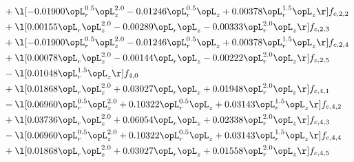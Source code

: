 \begin{alignat}{2}
& + \l[  -0.01900 \opL_r^{0.5} \opL_z^{2.0}   -0.01246 \opL_r^{0.5} \opL_z +  0.00378 \opL_r^{1.5} \opL_z  \r] f_{c,2,2} \nonumber \\ 
& + \l[  0.00155 \opL_r \opL_z^{2.0}   -0.00289 \opL_r \opL_z   -0.00333 \opL_r^{2.0} \opL_z  \r] f_{c,2,3} \nonumber \\ 
& + \l[  -0.01900 \opL_r^{0.5} \opL_z^{2.0}   -0.01246 \opL_r^{0.5} \opL_z +  0.00378 \opL_r^{1.5} \opL_z  \r] f_{c,2,4} \nonumber \\ 
& + \l[  0.00078 \opL_r \opL_z^{2.0}   -0.00144 \opL_r \opL_z   -0.00222 \opL_r^{2.0} \opL_z  \r] f_{c,2,5} \nonumber \\ 
& - \l[  0.01048 \opL_r^{1.5} \opL_z  \r] f_{4,0} \nonumber \\ 
& + \l[  0.01868 \opL_r \opL_z^{2.0} +  0.03027 \opL_r \opL_z +  0.01948 \opL_r^{2.0} \opL_z  \r] f_{c,4,1} \nonumber \\ 
& - \l[  0.06960 \opL_r^{0.5} \opL_z^{2.0} +  0.10322 \opL_r^{0.5} \opL_z +  0.03143 \opL_r^{1.5} \opL_z  \r] f_{c,4,2} \nonumber \\ 
& + \l[  0.03736 \opL_r \opL_z^{2.0} +  0.06054 \opL_r \opL_z +  0.02338 \opL_r^{2.0} \opL_z  \r] f_{c,4,3} \nonumber \\ 
& - \l[  0.06960 \opL_r^{0.5} \opL_z^{2.0} +  0.10322 \opL_r^{0.5} \opL_z +  0.03143 \opL_r^{1.5} \opL_z  \r] f_{c,4,4} \nonumber \\ 
& + \l[  0.01868 \opL_r \opL_z^{2.0} +  0.03027 \opL_r \opL_z +  0.01558 \opL_r^{2.0} \opL_z  \r] f_{c,4,5} \nonumber \\ 
\end{alignat} 



